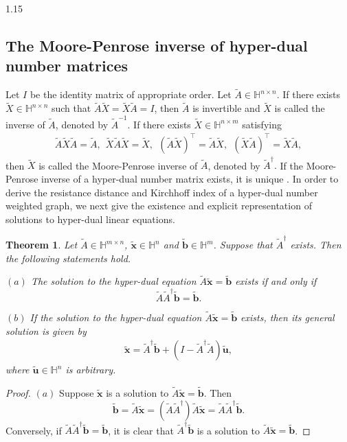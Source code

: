 \documentclass[preprint,12pt]{elsarticle1}
\newtheorem{thm}{Theorem}[section]
\numberwithin{equation}{section}
\begin{document}
\begin{spacing}{1.15}
\subsection{The Moore-Penrose inverse of hyper-dual number matrices}
Let $I$ be the identity matrix of appropriate order. Let $\widetilde{A}\in \mathbb{H}^{n\times n}$.  If there exists $\widetilde{X}\in\mathbb{H}^{n\times n}$ such that $\widetilde{A}\widetilde{X}=\widetilde{X}\widetilde{A}=I$, then $\widetilde{A}$ is invertible and $\widetilde{X}$ is called the inverse of $\widetilde{A}$, denoted by $\widetilde{A}^{-1}$. If there exists  $\widetilde{X}\in\mathbb{H}^{n\times m}$  satisfying
\begin{align}\label{mp2}\widetilde{A}\widetilde{X}\widetilde{A}=\widetilde{A}, \ \ \widetilde{X}\widetilde{A}\widetilde{X}
=\widetilde{X},\ \  (\widetilde{A}\widetilde{X})^{\top}
=\widetilde{A}\widetilde{X} , \ \ (\widetilde{X}\widetilde{A})^{\top}
=\widetilde{X}\widetilde{A}, \end{align}
then $\widetilde{X}$ is called the Moore-Penrose inverse of $\widetilde{A}$, denoted by $\widetilde{A}^{\dag}.$
 If the Moore-Penrose inverse of a hyper-dual number matrix exists, it is unique \cite{xiao2024c}.
In order to derive  the resistance distance and Kirchhoff index of a hyper-dual number weighted graph, we next give the existence and explicit representation of solutions to hyper-dual linear equations.

\begin{thm}\label{3.3}
Let $\widetilde{A}\in\mathbb{H}^{m\times n}$, $ \widetilde{\mathbf{x}}\in\mathbb{H}^{n}$ and $\widetilde{\mathbf{b}}\in\mathbb{H}^{m}$. Suppose that $\widetilde{A}^{\dag}$ exists. Then the following statements hold.

$(a)$ The solution  to the hyper-dual  equation
$\widetilde{A}\widetilde{\mathbf{x}}=\widetilde{\mathbf{b}}$ exists  if and only if $$\widetilde{A}\widetilde{A}^{\dag}
\widetilde{\mathbf{b}}=\widetilde{\mathbf{b}}.$$

$(b)$  If the solution to the hyper-dual equation $\widetilde{A}\widetilde{\mathbf{x}}=\widetilde{\mathbf{b}}$ exists, then its general solution is given by \begin{align}\label{eq91} \widetilde{\mathbf{x}}=\widetilde{A}^{\dag}\widetilde{\mathbf{b}}
+(I-\widetilde{A}^{\dag}\widetilde{A})\widetilde{\mathbf{u}},
\end{align} where $\widetilde{\mathbf{u}}\in \mathbb{H}^{n}$ is arbitrary.
\end{thm}
\begin{proof}
$(a)$ Suppose $\widetilde{\mathbf{x}}$ is a solution to $\widetilde{A}
\widetilde{\mathbf{x}}=\widetilde{\mathbf{b}}$. Then
$$\widetilde{\mathbf{b}}=\widetilde{A}
\widetilde{\mathbf{x}}=(\widetilde{A}\widetilde{A}^{\dag})
\widetilde{A}
\widetilde{\mathbf{x}}=
\widetilde{A}\widetilde{A}^{\dag}
\widetilde{\mathbf{b}}.$$ Conversely, if
$\widetilde{A}\widetilde{A}^{\dag}
\widetilde{\mathbf{b}}
=\widetilde{\mathbf{b}}$, it is clear that $\widetilde{A}^{\dag}\widetilde{\mathbf{b}}$ is a solution to $\widetilde{A}
\widetilde{\mathbf{x}}
=\widetilde{\mathbf{b}}$.


\end{proof}
\end{spacing}
\end{document}
